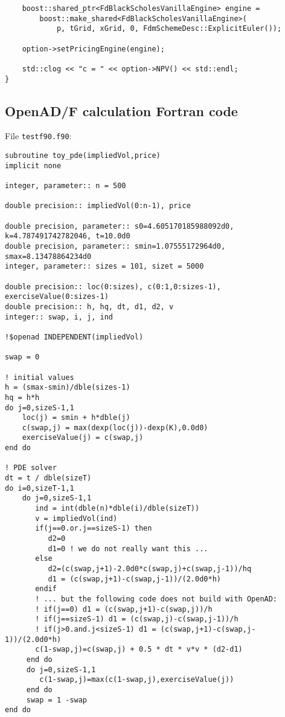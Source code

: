 \documentclass{amsart}
\theoremstyle{plain}
\numberwithin{equation}{section}
\begin{document}
\begin{appendix}
\begin{verbatim}
    boost::shared_ptr<FdBlackScholesVanillaEngine> engine =
        boost::make_shared<FdBlackScholesVanillaEngine>(
            p, tGrid, xGrid, 0, FdmSchemeDesc::ExplicitEuler());

    option->setPricingEngine(engine);

    std::clog << "c = " << option->NPV() << std::endl;
}
\end{verbatim}

\subsection{OpenAD/F calculation Fortran code}

File \verb+testf90.f90+:

\begin{verbatim}
subroutine toy_pde(impliedVol,price)
implicit none

integer, parameter:: n = 500

double precision:: impliedVol(0:n-1), price

double precision, parameter:: s0=4.605170185988092d0, k=4.787491742782046, t=10.0d0
double precision, parameter:: smin=1.07555172964d0, smax=8.13478864234d0
integer, parameter:: sizes = 101, sizet = 5000

double precision:: loc(0:sizes), c(0:1,0:sizes-1), exerciseValue(0:sizes-1)
double precision:: h, hq, dt, d1, d2, v
integer:: swap, i, j, ind

!$openad INDEPENDENT(impliedVol)

swap = 0

! initial values
h = (smax-smin)/dble(sizes-1)
hq = h*h
do j=0,sizeS-1,1
    loc(j) = smin + h*dble(j)
    c(swap,j) = max(dexp(loc(j))-dexp(K),0.0d0)
    exerciseValue(j) = c(swap,j)
end do

! PDE solver
dt = t / dble(sizeT)
do i=0,sizeT-1,1
    do j=0,sizeS-1,1
       ind = int(dble(n)*dble(i)/dble(sizeT))
       v = impliedVol(ind)
       if(j==0.or.j==sizeS-1) then
          d2=0
          d1=0 ! we do not really want this ...
       else
          d2=(c(swap,j+1)-2.0d0*c(swap,j)+c(swap,j-1))/hq
          d1 = (c(swap,j+1)-c(swap,j-1))/(2.0d0*h)
       endif
       ! ... but the following code does not build with OpenAD:
       ! if(j==0) d1 = (c(swap,j+1)-c(swap,j))/h
       ! if(j==sizeS-1) d1 = (c(swap,j)-c(swap,j-1))/h
       ! if(j>0.and.j<sizeS-1) d1 = (c(swap,j+1)-c(swap,j-1))/(2.0d0*h)
       c(1-swap,j)=c(swap,j) + 0.5 * dt * v*v * (d2-d1)
     end do
     do j=0,sizeS-1,1
        c(1-swap,j)=max(c(1-swap,j),exerciseValue(j))
     end do
     swap = 1 -swap
end do
  

\end{verbatim}
\end{appendix}
\end{document}
